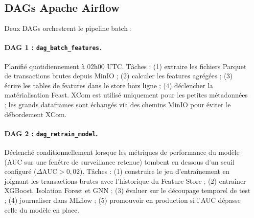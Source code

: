 \documentclass[12pt,a4paper,oneside]{book}
\theoremstyle{definition}
\theoremstyle{plain}
\begin{document}
\subsection{DAGs Apache Airflow}

Deux DAGs orchestrent le pipeline batch :

\paragraph{DAG 1 : \texttt{dag\_batch\_features}.}
Planifié quotidiennement à 02h00 UTC. Tâches : (1) extraire les fichiers Parquet de transactions brutes depuis MinIO ; (2) calculer les features agrégées ; (3) écrire les tables de features dans le store hors ligne ; (4) déclencher la matérialisation Feast. XCom est utilisé uniquement pour les petites métadonnées ; les grands dataframes sont échangés via des chemins MinIO pour éviter le débordement XCom.

\paragraph{DAG 2 : \texttt{dag\_retrain\_model}.}
Déclenché conditionnellement lorsque les métriques de performance du modèle (AUC sur une fenêtre de surveillance retenue) tombent en dessous d'un seuil configuré ($\Delta\text{AUC} > 0,02$). Tâches : (1) construire le jeu d'entraînement en joignant les transactions brutes avec l'historique du Feature Store ; (2) entraîner XGBoost, Isolation Forest et GNN ; (3) évaluer sur le découpage temporel de test ; (4) journaliser dans MLflow ; (5) promouvoir en production si l'AUC dépasse celle du modèle en place.
\end{document}
